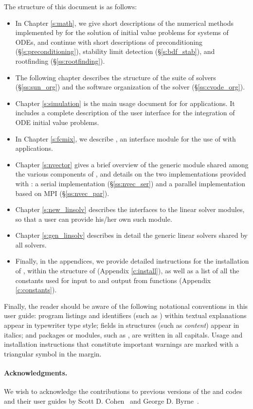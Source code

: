 The structure of this document is as follows:
\begin{itemize}
\item
  In Chapter \ref{s:math}, we give short descriptions of the numerical
  methods implemented by {\cvode} for the solution of initial value
  problems for systems of ODEs, and continue with short descriptions of
  preconditioning (\S\ref{s:preconditioning}), stability limit detection
  (\S\ref{s:bdf_stab}), and rootfinding (\S\ref{ss:rootfinding}).
\item
  The following chapter describes the structure of the {\sundials} suite
  of solvers (\S\ref{ss:sun_org}) and the software organization of the {\cvode}
  solver (\S\ref{ss:cvode_org}). 
\item
  Chapter \ref{s:simulation} is the main usage document for {\cvode} for
  {\C} applications.  It includes a complete description of the user interface
  for the integration of ODE initial value problems.
\item
  In Chapter \ref{s:fcmix}, we describe {\fcvode}, an interface module
  for the use of {\cvode} with {\F} applications.
\item
  Chapter \ref{s:nvector} gives a brief overview of the generic
  {\nvector} module shared among the various components of
  {\sundials}, and details on the two {\nvector} implementations
  provided with {\sundials}: a serial implementation
  (\S\ref{ss:nvec_ser}) and a parallel implementation based on
  MPI (\S\ref{ss:nvec_par}).
\item
  Chapter \ref{s:new_linsolv} describes the interfaces to the linear
  solver modules, so that a user can provide his/her own such module.
\item
  Chapter \ref{s:gen_linsolv} describes in detail the generic linear
  solvers shared by all {\sundials} solvers.
\item
  Finally, in the appendices, we provide detailed instructions for the installation
  of {\cvode}, within the structure of {\sundials} (Appendix \ref{c:install}), as well
  as a list of all the constants used for input to and output from {\cvode} functions
  (Appendix \ref{c:constants}).
\end{itemize}

Finally, the reader should be aware of the following notational conventions
in this user guide:  program listings and identifiers (such as ) 
within textual explanations appear in typewriter type style; 
fields in {\C} structures (such as {\em content}) appear in italics;
and packages or modules, such as {\cvdense}, are written in all capitals. 
Usage and installation instructions that constitute important warnings
are marked with a triangular symbol {\warn} in the margin.

\paragraph{Acknowledgments.}
We wish to acknowledge the contributions to previous versions of the
{\cvode} and {\pvode} codes and their user guides by Scott D. Cohen~\cite{CoHi:94}
and George D. Byrne~\cite{ByHi:98}.

